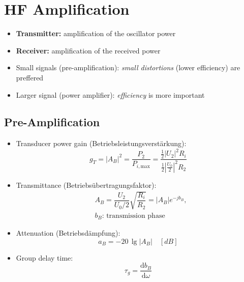 \section{HF Amplification}
\begin{itemize}
    \itemsep0pt
    \item \textbf{Transmitter:} amplification of the oscillator power
    \item \textbf{Receiver:} amplification of the received power
    \item Small signals (pre-amplification): \textit{small distortions} (lower efficiency) are preffered
    \item Larger signal (power amplifier): \textit{efficiency} is more important
\end{itemize}

\subsection{Pre-Amplification}
\begin{itemize}
    \itemsep0pt
    \item Transducer power gain (Betriebsleistungsverstärkung):
        \begin{equation*}
            g_T = |A_B|^2 = \dfrac{P_2}{P_{i,\mathrm{max}}} = \dfrac{\frac{1}{2}|U_2|^2 R_i}{\frac{1}{2}|\frac{U_0}{2}|^2 R_2}
        \end{equation*}
    \item Transmittance (Betriebsübertragungsfaktor):
        \begin{align*}
            &A_B = \dfrac{U_2}{U_0 / 2}\sqrt{\dfrac{R_i}{R_2}} = |A_B| e^{-jb_B},\\
            &b_B\text{: transmission phase}
        \end{align*}
    \item Attenuation (Betriebsdämpfung):
        \begin{equation*}
            a_B = -20\,\lg |A_B| \quad [\si{dB}]
        \end{equation*}
    \item Group delay time:
        \begin{equation*}
            \tau_g = \dfrac{\mathrm{d}b_B}{\mathrm{d}\omega}
        \end{equation*}
\end{itemize}

